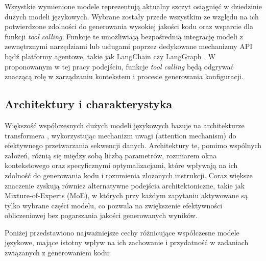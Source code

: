 Wszystkie wymienione modele reprezentują aktualny szczyt osiągnięć w dziedzinie dużych modeli językowych. Wybrane zostały przede wszystkim ze względu na ich potwierdzone zdolności do generowania wysokiej jakości kodu oraz wsparcie dla funkcji \textit{tool calling}. Funkcje te umożliwiają bezpośrednią integrację modeli z zewnętrznymi narzędziami lub usługami poprzez dedykowane mechanizmy API bądź platformy agentowe, takie jak LangChain \cite{langchain} czy LangGraph \cite{langgraph}. W proponowanym w tej pracy podejściu, funkcje \textit{tool calling} będą odgrywać znaczącą rolę w zarządzaniu kontekstem i procesie generowania konfiguracji.

\subsection{Architektury i charakterystyka}

Większość współczesnych dużych modeli językowych bazuje na architekturze transformera \cite{vaswani_attention_2023}, wykorzystując mechanizm uwagi (attention mechanism) do efektywnego przetwarzania sekwencji danych. Architektury te, pomimo wspólnych założeń, różnią się między sobą liczbą parametrów, rozmiarem okna kontekstowego oraz specyficznymi optymalizacjami, które wpływają na ich zdolność do generowania kodu i rozumienia złożonych instrukcji. Coraz większe znaczenie zyskują również alternatywne podejścia architektoniczne, takie jak Mixture-of-Experts (MoE), w których przy każdym zapytaniu aktywowane są tylko wybrane części modelu, co pozwala na zwiększenie efektywności obliczeniowej bez pogarszania jakości generowanych wyników.

Poniżej przedstawiono najważniejsze cechy różnicujące współczesne modele językowe, mające istotny wpływ na ich zachowanie i przydatność w zadaniach związanych z generowaniem kodu:


